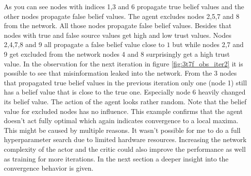 \documentclass[11pt, a4paper]{article}
\begin{document}
As you can see nodes with indices 1,3 and 6 propagate true belief values and the other nodes propagate false belief values. The agent excludes nodes 2,5,7 and 8 from the network. All those nodes propagate false belief values. Besides that nodes with true and false source values get high and low trust values. Nodes 2,4,7,8 and 9 all propagate a false belief value close to $1$ but while nodes 2,7 and 9 get excluded from the network nodes 4 and 8 surprisingly get a high trust value. In the observation for the next iteration in figure \ref{fig:3t7f_obs_iter2} it is possible to see that misinformation leaked into the network. From the 3 nodes that propagated true belief values in the previous iteration only one (node 1) still has a belief value that is close to the true one. Especially node 6 heavily changed its belief value. The action of the agent looks rather random. Note that the belief value for excluded nodes has no influence. \newline
This example confirms that the agent doesn't act fully optimal which again indicates convergence to a local maxima. This might be caused by multiple reasons. It wasn't possible for me to do a full hyperparameter search due to limited hardware resources. Increasing the network complexity of the actor and the critic could also improve the performance as well as training for more iterations. In the next section a deeper insight into the convergence behavior is given.
\end{document}
